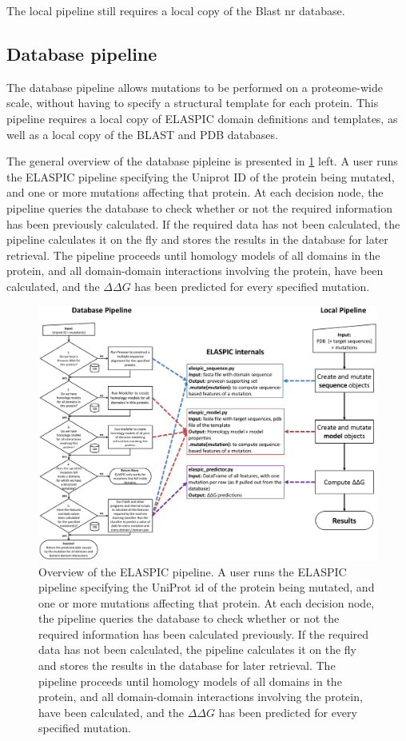 The local pipeline still requires a local copy of the Blast nr database.

\subsection{Database pipeline}

The database pipeline allows mutations to be performed on a proteome-wide scale, without having to specify a structural template for each protein. This pipeline requires a local copy of ELASPIC domain definitions and templates, as well as a local copy of the BLAST and PDB databases.

The general overview of the database pipleine is presented in \ref{fig:elaspic_pipeline} left. A user runs the ELASPIC pipeline specifying the Uniprot ID of the protein being mutated, and one or more mutations affecting that protein. At each decision node, the pipeline queries the database to check whether or not the required information has been previously calculated. If the required data has not been calculated, the pipeline calculates it on the fly and stores the results in the database for later retrieval. The pipeline proceeds until homology models of all domains in the protein, and all domain-domain interactions involving the protein, have been calculated, and the $\Delta \Delta G$ has been predicted for every specified mutation.

\begin{figure}[ht]
	\centering
	\includegraphics[width=1.0\textwidth]{static/elaspic/elaspic_flowchart.pdf}
	\caption[Overview of the ELASPIC pipeline]{Overview of the ELASPIC pipeline. A user runs the ELASPIC pipeline specifying the UniProt id of the protein being mutated, and one or more mutations affecting that protein. At each decision node, the pipeline queries the database to check whether or not the required information has been calculated previously. If the required data has not been calculated, the pipeline calculates it on the fly and stores the results in the database for later retrieval. The pipeline proceeds until homology models of all domains in the protein, and all domain-domain interactions involving the protein, have been calculated, and the $\Delta \Delta G$ has been predicted for every specified mutation.}
	\label{fig:elaspic_pipeline}
\end{figure}


